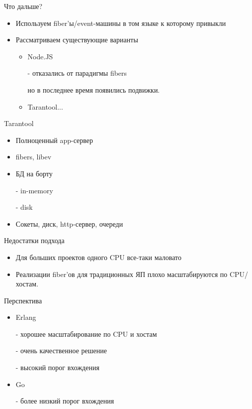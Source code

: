 \documentclass[aspectratio=169]{beamer}
\begin{document}
\begin{frame}{Что дальше?}
    \begin{itemize}
        \item Используем fiber'ы/event-машины
            в том языке к которому привыкли
        \item Рассматриваем существующие варианты
            \begin{itemize}
                \item Node.JS
                    \par - отказались от парадигмы fibers
                    \par но в последнее время появились подвижки.
                \item\pause Tarantool...
            \end{itemize}
    \end{itemize}
\end{frame}


\begin{frame}{Tarantool}
    \begin{itemize}
        \item Полноценный app-сервер
        \item fibers, libev
        \item БД на борту
            \par - in-memory
            \par - disk
        \item Сокеты, диск, http-сервер, очереди
    \end{itemize}
\end{frame}

\begin{frame}{Недостатки подхода}
    \begin{itemize}
        \item Для больших проектов одного CPU все-таки маловато
        \item Реализации fiber'ов для традиционных
            ЯП плохо масштабируются по CPU/хостам.
    \end{itemize}
\end{frame}

\begin{frame}{Перспектива}
    \begin{itemize}
        \item Erlang
            \par - хорошее масштабирование по CPU и хостам
            \par - очень качественное решение
            \par - высокий порог вхождения
        \item Go
            \par - более низкий порог вхождения
    \end{itemize}
\end{frame}
\end{document}
